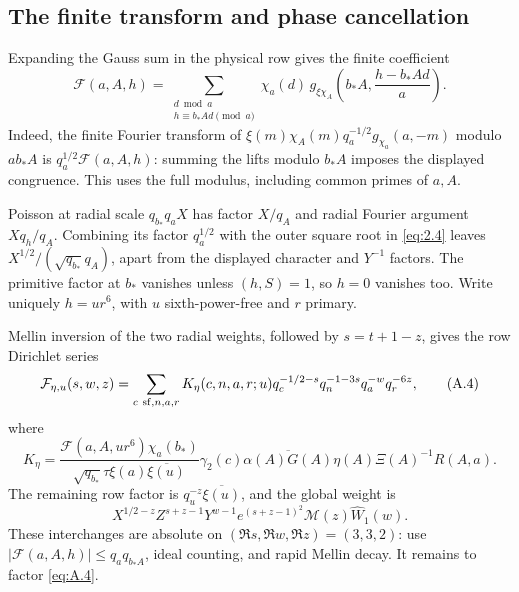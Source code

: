 \documentclass[11pt,a4paper]{article}
\begin{document}
\subsection{The finite transform and phase cancellation}\label{sec:A.2}

Expanding the Gauss sum in the physical row gives the finite coefficient \[
\mathcal F(a,A,h)=
\sum_{\substack{d\bmod a\\h\equiv b_*Ad\pmod a}}
\chi_a(d)\,g_{\xi\chi_A}\!\left(b_*A,\frac{h-b_*Ad}{a}\right).
\tag{A.3}\label{eq:A.3}
\] Indeed, the finite Fourier transform of \(\xi(m)\chi_A(m)q_a^{-1/2}g_{\chi_a}(a,-m)\) modulo \(ab_*A\) is \(q_a^{1/2}\mathcal F(a,A,h)\): summing the lifts modulo \(b_*A\) imposes the displayed congruence. This uses the full modulus, including common primes of \(a,A\).

Poisson at radial scale \(q_{b_*}q_aX\) has factor \(X/q_A\) and radial Fourier argument \(Xq_h/q_A\). Combining its factor \(q_a^{1/2}\) with the outer square root in \eqref{eq:2.4} leaves \(X^{1/2}/(\sqrt{q_{b_*}}q_A)\), apart from the displayed character and \(Y^{-1}\) factors. The primitive factor at \(b_*\) vanishes unless \((h,S)=1\), so \(h=0\) vanishes too. Write uniquely \(h=ur^6\), with \(u\) sixth-power-free and \(r\) primary.

Mellin inversion of the two radial weights, followed by \(s=t+1-z\), gives the row Dirichlet series \[
\mathcal F_{\eta,u}(s,w,z)=
\sum_{c\ {\rm sf},n,a,r} K_\eta(c,n,a,r;u)
q_c^{-1/2-s}q_n^{-1-3s}q_a^{-w}q_r^{-6z},
\tag{A.4}\label{eq:A.4}
\] where \[
K_\eta=
\frac{\mathcal F(a,A,ur^6)\chi_a(b_*)}
{\sqrt{q_{b_*}}\tau\xi(a)\overline{\xi(u)}}
\gamma_2(c)\overline{\alpha(A)G(A)}\eta(A)\Xi(A)^{-1}R(A,a).
\tag{A.5}\label{eq:A.5}
\] The remaining row factor is \(q_u^{-z}\overline{\xi(u)}\), and the global weight is \[
X^{1/2-z}Z^{s+z-1}Y^{w-1}e^{(s+z-1)^2}\mathscr M(z)\widehat W_1(w).
\] These interchanges are absolute on \((\Re s,\Re w,\Re z)=(3,3,2)\): use \(|\mathcal F(a,A,h)|\le q_aq_{b_*A}\), ideal counting, and rapid Mellin decay. It remains to factor \eqref{eq:A.4}.
\end{document}
